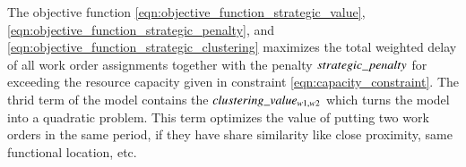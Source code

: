 


The objective function 
\eqref{eqn:objective_function_strategic_value}, 
\eqref{eqn:objective_function_strategic_penalty}, and
\eqref{eqn:objective_function_strategic_clustering}
maximizes the total weighted delay of all work order assignments together
with the penalty $strategic\_penalty$ for exceeding the resource capacity given in constraint
\eqref{eqn:capacity_constraint}. The thrid term  
of the model contains the $clustering\_value_{w1, w2}$ which turns the model into a 
quadratic problem. This term optimizes the value of putting two work orders
in the same period, if they have share similarity like close proximity, 
same functional location, etc. 

